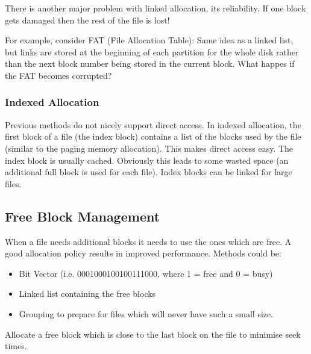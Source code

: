 \documentclass{article}%
\begin{document}
There is another major problem with linked allocation, its reliability.
If one block gets damaged then the rest of the file is lost!

For example, consider FAT (File Allocation Table):
Same idea as a linked list, but links are stored at the beginning of each partition for the whole disk rather than the next block number being stored in the current block.
What happes if the FAT becomes corrupted?

\subsubsection{Indexed Allocation}
\label{sec:orgf51d540}
Previous methods do not nicely support direct access.
In indexed allocation, the first block of a file (the index block) contains a list of the blocks used by the file (similar to the paging memory allocation).
This makes direct access easy.
The index block is usually cached.
Obviously this leads to some wasted space (an additional full block is used for each file).
Index blocks can be linked for large files.

\subsection{Free Block Management}
\label{sec:orgcc68fcf}
When a file needs additional blocks it needs to use the ones which are free.
A good allocation policy results in improved performance.
Methods could be:
\begin{itemize}
\item Bit Vector (i.e. 0001000100100111000, where 1 = free and 0 = busy)
\item Linked list containing the free blocks
\item Grouping to prepare for files which will never have such a small size.
\end{itemize}
Allocate a free block which is close to the last block on the file to minimise seek times.
\end{document}
